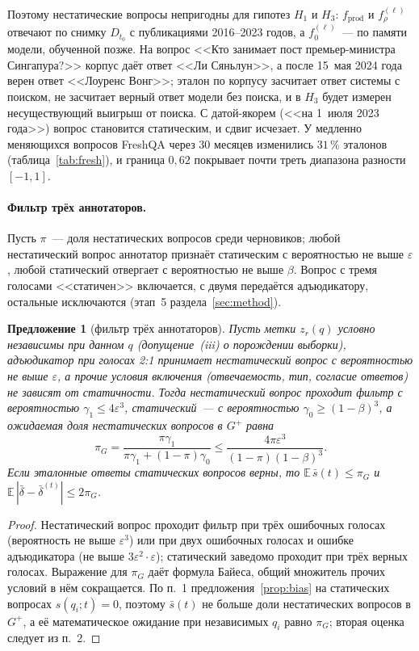 \documentclass{article}
\newtheorem{proposition}[theorem]{Предложение}%
\newcommand{\fprod}{f_{\mathrm{prod}}}
\begin{document}
Поэтому нестатические вопросы непригодны для гипотез $H_1$ и $H_3$: $\fprod$ и $f_\rho^{(\ell)}$ отвечают по снимку $D_{t_0}$ с публикациями 2016--2023 годов, а $f_0^{(\ell)}$~--- по памяти модели, обученной позже. На вопрос <<Кто занимает пост премьер-министра Сингапура?>> корпус даёт ответ <<Ли Сяньлун>>, а после 15~мая 2024 года верен ответ <<Лоуренс Вонг>>; эталон по корпусу засчитает ответ системы с поиском, не засчитает верный ответ модели без поиска, и в $H_3$ будет измерен несуществующий выигрыш от поиска. С датой-якорем (<<на 1~июля 2023 года>>) вопрос становится статическим, и сдвиг исчезает. У медленно меняющихся вопросов FreshQA через 30 месяцев изменились $31\,\%$ эталонов (таблица~\ref{tab:fresh}), и граница $0{,}62$ покрывает почти треть диапазона разности $[-1,1]$.

\paragraph{Фильтр трёх аннотаторов.} Пусть $\pi$~--- доля нестатических вопросов среди черновиков; любой нестатический вопрос аннотатор признаёт статическим с вероятностью не выше $\varepsilon$, любой статический отвергает с вероятностью не выше $\beta$. Вопрос с тремя голосами <<статичен>> включается, с двумя передаётся адъюдикатору, остальные исключаются (этап~5 раздела~\ref{sec:method}).

\begin{proposition}[фильтр трёх аннотаторов]\label{prop:filter}
Пусть метки $z_r(q)$ условно независимы при данном $q$ (допущение~(iii) о порождении выборки), адъюдикатор при голосах 2:1 принимает нестатический вопрос с вероятностью не выше $\varepsilon$, а прочие условия включения (отвечаемость, тип, согласие ответов) не зависят от статичности. Тогда нестатический вопрос проходит фильтр с вероятностью $\gamma_1\le4\varepsilon^3$, статический~--- с вероятностью $\gamma_0\ge(1-\beta)^3$, а ожидаемая доля нестатических вопросов в $G^+$ равна
\begin{equation}\label{eq:piG}
  \pi_G=\frac{\pi\gamma_1}{\pi\gamma_1+(1-\pi)\gamma_0}\le\frac{4\pi\varepsilon^3}{(1-\pi)(1-\beta)^3}.
\end{equation}
Если эталонные ответы статических вопросов верны, то $\mathbb{E}\,\bar s(t)\le\pi_G$ и $\mathbb{E}\,|\bar\delta-\bar\delta^{(t)}|\le2\pi_G$.
\end{proposition}

\begin{proof}
Нестатический вопрос проходит фильтр при трёх ошибочных голосах (вероятность не выше $\varepsilon^3$) или при двух ошибочных голосах и ошибке адъюдикатора (не выше $3\varepsilon^2\cdot\varepsilon$); статический заведомо проходит при трёх верных голосах. Выражение для $\pi_G$ даёт формула Байеса, общий множитель прочих условий в нём сокращается. По п.~1 предложения~\ref{prop:bias} на статических вопросах $s(q_i;t)=0$, поэтому $\bar s(t)$ не больше доли нестатических вопросов в $G^+$, а её математическое ожидание при независимых $q_i$ равно $\pi_G$; вторая оценка следует из п.~2.
\end{proof}
\end{document}
